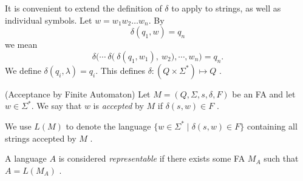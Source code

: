 \documentclass{bcthesis}
\newcommand{\footcite}[2]{\xspace\cite[pg.~{#2}]{#1}\xspace}
\begin{document}
	\begin{remark}
		It is convenient to extend the definition of $\delta$ to apply to strings, as well as individual symbols.
		Let $w = w_1 w_2 \dots w_n$.
		By 
		\[
			\delta(q_1, w) = q_n
		\] 
		we mean 
		\[
			\delta\bigg( \cdots \ \delta\Big( \ \delta(q_1, w_1), \ w_2 \Big), \cdots, w_n \bigg) = q_n.
		\]
		We define $\delta(q_i, \lambda) = q_i$.
		This defines $\delta: (Q \times \Sigma^*) \mapsto Q$ \footcite{hopcroft}{17}.
	\end{remark}

	\begin{definition}(Acceptance by Finite Automaton)
		Let $M = (Q, \Sigma, s, \delta, F)$ be an FA and let $w \in \Sigma^*$.
		We say that $w$ is \textit{accepted} by $M$ if $\delta(s, w) \in F$ \footcite{hopcroft}{18}.

		We use $L(M)$ to denote the language $\{ w \in \Sigma^* \mid \delta(s, w) \in F \}$ containing all strings accepted by $M$ \footcite{hopcroft}{18}.

		A language $A$ is considered \textit{representable} if there exists some FA $M_A$ such that $A = L(M_A)$ \footcite{salomaa}{20}.
	\end{definition}
\end{document}
